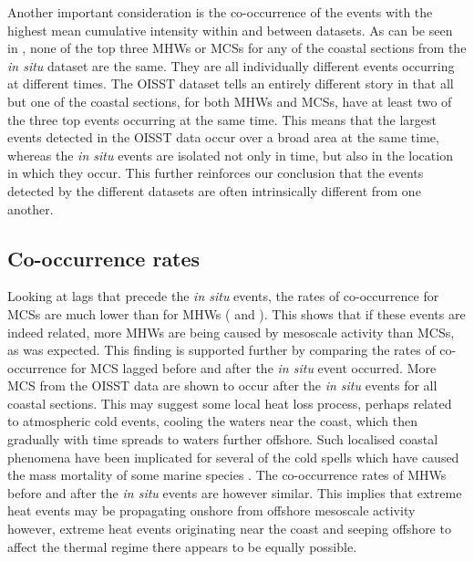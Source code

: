 \documentclass[a4paper,10pt,review]{elsarticle}
\begin{document}
Another important consideration is the co-occurrence of the events with the highest mean cumulative intensity within and between datasets. As can be seen in , none of the top three MHWs or MCSs for any of the coastal sections from the \emph{in situ} dataset are the same. They are all individually different events occurring at different times. The OISST dataset tells an entirely different story in that all but one of the coastal sections, for both MHWs and MCSs, have at least two of the three top events occurring at the same time. This means that the largest events detected in the OISST data occur over a broad area at the same time, whereas the \emph{in situ} events are isolated not only in time, but also in the location in which they occur. This further reinforces our conclusion that the events detected by the different datasets are often intrinsically different from one another.

\subsection{Co-occurrence rates}
Looking at lags that precede the \emph{in situ} events, the rates of co-occurrence for MCSs are much lower than for MHWs ( and ). This shows that if these events are indeed related, more MHWs are being caused by mesoscale activity than MCSs, as was expected. This finding is supported further by comparing the rates of co-occurrence for MCS lagged before and after the \emph{in situ} event occurred. More MCS from the OISST data are shown to occur after the \emph{in situ} events for all coastal sections. This may suggest some local heat loss process, perhaps related to atmospheric cold events, cooling the waters near the coast, which then gradually with time spreads to waters further offshore. Such localised coastal phenomena have been implicated for several of the cold spells which have caused the mass mortality of some marine species \citep[e.g.][]{Gunter1941, Firth2011}. The co-occurrence rates of MHWs before and after the \emph{in situ} events are however similar. This implies that extreme heat events may be propagating onshore from offshore mesoscale activity however, extreme heat events originating near the coast and seeping offshore to affect the thermal regime there appears to be equally possible.
\end{document}
